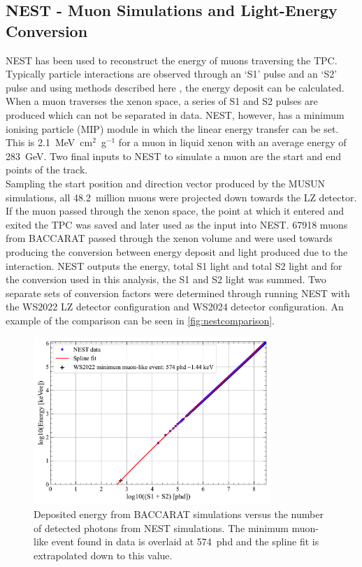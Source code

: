 \subsection{NEST - Muon Simulations and Light-Energy Conversion}
NEST has been used to reconstruct the energy of muons traversing the TPC. Typically particle interactions are observed through an `S1' pulse and an `S2' pulse and using methods described here \cite{NEST1}, the energy deposit can be calculated. When a muon traverses the xenon space, a series of S1 and S2 pulses are produced which can not be separated in data. NEST, however, has a minimum ionising particle (MIP) module in which the linear energy transfer can be set. This is 2.1~MeV~cm$^2$~g$^{-1}$\cite{MUE} for a muon in liquid xenon with an average energy of 283~GeV. Two final inputs to NEST to simulate a muon are the start and end points of the track.\\
Sampling the start position and direction vector produced by the MUSUN simulations, all 48.2~million muons were projected down towards the LZ detector. If the muon passed through the xenon space, the point at which it entered and exited the TPC was saved and later used as the input into NEST. 67918 muons from BACCARAT passed through the xenon volume and were used towards producing the conversion between energy deposit and light produced due to the interaction. NEST outputs the energy, total S1 light and total S2 light and for the conversion used in this analysis, the S1 and S2 light was summed.
Two separate sets of conversion factors were determined through running NEST with the WS2022 LZ detector configuration and WS2024 detector configuration. An example of the comparison can be seen in \autoref{fig:nestcomparison}.
\begin{figure}[htbp]
    \centering
    \includegraphics[width=0.8\textwidth]{figures/Muons/TPCEnergyConversion.pdf}
    \caption{Deposited energy from BACCARAT simulations versus the number of detected photons from NEST simulations. The minimum muon-like event found in data is overlaid at 574~phd and the spline fit is extrapolated down to this value.}
    \label{fig:nestcomparison}
\end{figure}
